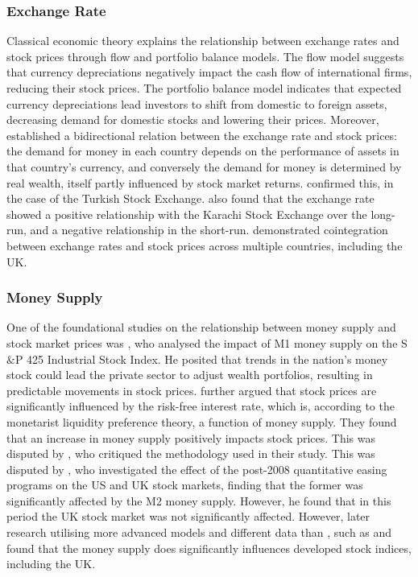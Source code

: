 \documentclass[11pt,a4paper]{article}
\newcommand{\citeboth}[1]{\citeauthor{#1} \citep{#1}}
\begin{document}
\subsubsection{Exchange Rate}

Classical economic theory explains the relationship between exchange rates and stock prices through flow and portfolio balance models. The flow model suggests that currency depreciations negatively impact the cash flow of international firms, reducing their stock prices. The portfolio balance model indicates that expected currency depreciations lead investors to shift from domestic to foreign assets, decreasing demand for domestic stocks and lowering their prices. 
Moreover, \citeboth{branson1977} established a bidirectional relation between the exchange rate and stock prices: the demand for money in each country depends on the performance of assets in that country’s currency, and conversely the demand for money is determined by real wealth, itself partly influenced by stock market returns. 
\citeboth{aydemir2009} confirmed this, in the case of the Turkish Stock Exchange. 
\citeboth{khan2018} also found that the exchange rate showed a positive relationship with the Karachi Stock Exchange over the long-run, and a negative relationship in the short-run. 
\citeboth{wong2022} demonstrated cointegration between exchange rates and stock prices across multiple countries, including the UK.

\subsubsection{Money Supply}

One of the foundational studies on the relationship between money supply and 
stock market prices was \citeboth{palmer1970}, who analysed the impact of M1 money supply on the S$\&$P 425 Industrial Stock Index. 
He posited that trends in the nation's money stock could lead the 
private sector to adjust wealth portfolios, resulting in 
predictable movements in stock prices. \citeboth{homa1971} further argued that 
stock prices are significantly influenced by the risk-free interest rate, 
which is, according to the monetarist liquidity preference theory, a 
function of money supply. They found that an increase in money supply 
positively impacts stock prices. This was disputed by \citeboth{pesando1974}, 
who critiqued the methodology used in their study. This was disputed by \citeboth{pícha2017},
who investigated the effect of the post-2008 quantitative easing programs on the US and UK stock markets, finding 
that the former was significantly affected by the M2 money supply. However, he found that in this period 
the UK stock market was not significantly affected.
However, later research utilising more advanced models and different data than \citeboth{palmer1970}, such as \citeboth{bahloul2017} and 
\citeboth{synek2024} found that the money supply does significantly influences developed stock indices, including the UK. 
\end{document}
